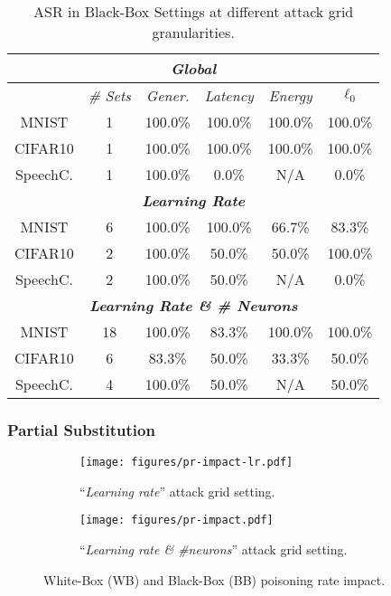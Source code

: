 \begin{table}[!htpb]
\centering
\footnotesize
\caption{ASR in Black-Box Settings at different attack grid granularities.}
\begin{tabular}{c|c|c|c|c|c}  \toprule
\multicolumn{6}{c}{\textit{\textbf{Global}}} \\ \midrule
 & \textit{\# Sets} & \textit{Gener.} & \textit{Latency} & \textit{Energy} & \textit{$\ell_0$} \\ \midrule
MNIST & 1 & 100.0\% & 100.0\% & 100.0\% & 100.0\% \\
CIFAR10 & 1   & 100.0\% & 100.0\% & 100.0\% & 100.0\% \\
SpeechC.  & 1 & 100.0\% & 0.0\% & N/A & 0.0\% \\ \midrule
\multicolumn{6}{c}{\textit{\textbf{Learning Rate}}} \\ \midrule
MNIST & 6 &  100.0\% & 100.0\% & 66.7\% & 83.3\% \\
CIFAR10 & 2 & 100.0\% & 50.0\% & 50.0\% & 100.0\% \\
SpeechC. & 2 & 100.0\% & 50.0\% & N/A & 0.0\% \\ \midrule
\multicolumn{6}{c}{\textit{\textbf{Learning Rate \& \# Neurons}}} \\ \midrule
MNIST & 18 & 100.0\% & 83.3\% & 100.0\% & 100.0\% \\
CIFAR10 & 6 & 83.3\% & 50.0\% & 33.3\% & 50.0\% \\
SpeechC. & 4 & 100.0\% & 50.0\% & N/A & 50.0\% \\ \bottomrule
\end{tabular}
\label{tab.asr-bb}
\end{table}

\subsubsection{Partial Substitution}
\label{subsub:partial}

\begin{figure*}[!htpb]
  \centering
  \begin{subfigure}{0.495\linewidth}
    \centering
    \texttt{[image: figures/pr-impact-lr.pdf]}
    \caption{``\textit{Learning rate}'' attack grid setting.}
    \label{fig:pr-impact-lr}
  \end{subfigure}
  \begin{subfigure}{0.495\linewidth}
    \centering
    \texttt{[image: figures/pr-impact.pdf]}
    \caption{``\textit{Learning rate \& \#neurons}'' attack grid setting.}
    \label{fig:pr-impact}
  \end{subfigure}
  \caption{White-Box (WB) and Black-Box (BB) poisoning rate impact.}
  \label{fig:impact}
\end{figure*}

